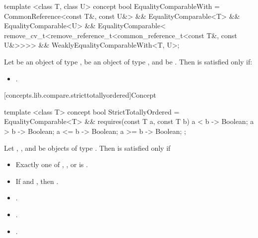 %
\begin{itemdecl}
template <class T, class U>
concept bool EqualityComparableWith =
  CommonReference<const T&, const U&> &&
  EqualityComparable<T> &&
  EqualityComparable<U> &&
  EqualityComparable<
    remove_cv_t<remove_reference_t<common_reference_t<const T&, const U&>>>> &&
  WeaklyEqualityComparableWith<T, U>;
\end{itemdecl}

\begin{itemdescr}
\pnum
Let  be an object of type ,  be an object of type , and  be
.
Then  is satisfied only if:

\begin{itemize}
\item {}.
\end{itemize}
\end{itemdescr}

[concepts.lib.compare.stricttotallyordered]{Concept }

%
\begin{itemdecl}
template <class T>
concept bool StrictTotallyOrdered =
  EqualityComparable<T> &&
  requires(const T a, const T b) {
    { a < b } -> Boolean;
    { a > b } -> Boolean;
    { a <= b } -> Boolean;
    { a >= b } -> Boolean;
  };
\end{itemdecl}

\begin{itemdescr}
\pnum
Let , , and  be objects of type .
Then  is satisfied only if

\begin{itemize}
\item Exactly one of , , or
       is .
\item If  and , then
      .
\item {}.
\item {}.
\item {}.
\end{itemize}

\end{itemdescr}

